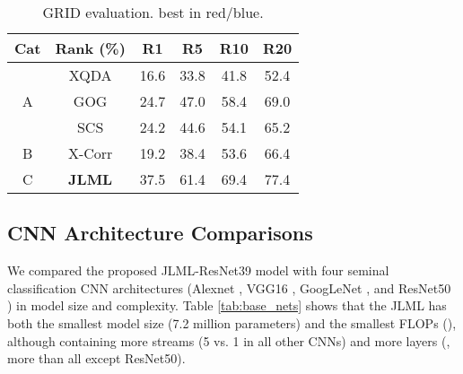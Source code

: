 \documentclass{article}
\begin{document}
\begin{table} [!h]
	\centering
	\footnotesize
	\renewcommand{\arraystretch}{1}
	\setlength{\tabcolsep}{0.35 cm}
	\vspace{-.5cm}
	\caption{\footnotesize
		GRID evaluation.
		 best in red/blue.
	}
	\vskip 0pt \begin{tabular}{|c||c|cccc|}
		\hline
\multirow{1}{*}{Cat}
		& Rank (\%) & R1 & R5 & R10 & R20 \\ \hline \hline
		\multirow{3}{*}{A}
		& XQDA 	& 16.6 & 33.8 & 41.8 & 52.4  \\   & GOG 	&  \color{blue}  24.7 &  \color{blue}  47.0 &  \color{blue}  58.4 &  \color{blue}  69.0 \\  & SCS 	& 24.2 & 44.6 & 54.1 & 65.2 \\ 
\hline
		\multirow{1}{*}{B}     
		& {X-Corr}  & 19.2  & 38.4 & 53.6 & 66.4 \\
		\hline
		\multirow{1}{*}{C}
		& {\bf JLML}  &   \color{red} 37.5 &  \color{red} 61.4  &  \color{red} 69.4  &   \color{red} 77.4  \\
\hline
	\end{tabular}\label{tab:res_grid}
	\vspace{-.3cm}
\end{table}









\subsection{CNN Architecture Comparisons}
We compared the proposed JLML-ResNet39 model with 
four seminal classification CNN architectures
(Alexnet \cite{krizhevsky2012imagenet},
VGG16 \cite{simonyan2014very},
GoogLeNet \cite{szegedy2015going}, and
ResNet50 \cite{he2016deep}) in model size and complexity.
Table \ref{tab:base_nets} shows that 
the JLML has both the  smallest model size (7.2 million parameters) 
and the  smallest FLOPs (),
although containing more streams (5 vs. 1 in all other CNNs)
and more layers (, more than all except ResNet50). 
\end{document}
